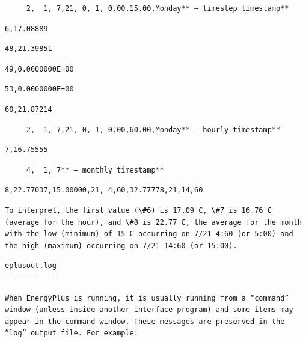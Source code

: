 \begin{lstlisting}
     2,  1, 7,21, 0, 1, 0.00,15.00,Monday** – timestep timestamp**
\end{lstlisting}

\begin{lstlisting}
6,17.08889
\end{lstlisting}

\begin{lstlisting}
48,21.39851
\end{lstlisting}

\begin{lstlisting}
49,0.0000000E+00
\end{lstlisting}

\begin{lstlisting}
53,0.0000000E+00
\end{lstlisting}

\begin{lstlisting}
60,21.87214
\end{lstlisting}

\begin{lstlisting}
     2,  1, 7,21, 0, 1, 0.00,60.00,Monday** – hourly timestamp**
\end{lstlisting}

\begin{lstlisting}
7,16.75555
\end{lstlisting}

\begin{lstlisting}
     4,  1, 7** – monthly timestamp**
\end{lstlisting}

\begin{lstlisting}
8,22.77037,15.00000,21, 4,60,32.77778,21,14,60
\end{lstlisting}

\begin{lstlisting}
To interpret, the first value (\#6) is 17.09 C, \#7 is 16.76 C (average for the hour), and \#8 is 22.77 C, the average for the month with the low (minimum) of 15 C occurring on 7/21 4:60 (or 5:00) and the high (maximum) occurring on 7/21 14:60 (or 15:00).
\end{lstlisting}

\begin{lstlisting}
eplusout.log
------------
\end{lstlisting}

\begin{lstlisting}
When EnergyPlus is running, it is usually running from a “command” window (unless inside another interface program) and some items may appear in the command window. These messages are preserved in the “log” output file. For example:
\end{lstlisting}

